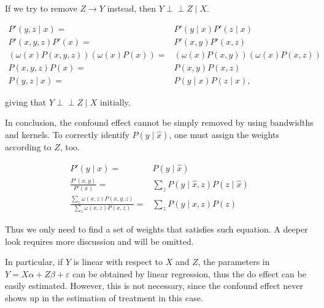\documentclass[a4 paper,12pt]{article}
\newcommand{\indep}{\perp \!\!\! \perp}
\begin{document}
If we try to remove $Z\to Y$ instead, then $Y\indep Z\mid X$.

\begin{align}
   P'(y,z\mid x)=&P'(y\mid x)P'(z\mid x)\\
   P'(x,y,z)P'(x)=&P'(x,y)P'(x,z)\\
   (\omega(x)P(x,y,z))(\omega(x)P(x))=&(\omega(x)P(x,y))(\omega(x)P(x,z))\\
   P(x,y,z)P(x)=&P(x,y)P(x,z)\\
   P(y,z\mid x)=&P(y\mid x)P(z\mid x),
\end{align}

giving that $Y\indep Z\mid X$ initially.

In conclusion, the confound effect cannot be simply removed by using bandwidths and kernels.
To correctly identify $P(y\mid\hat x)$,
one must assign the weights according to $Z$, too.

\begin{align}
   P'(y\mid x)=&P(y\mid \hat x)\\
   \frac{P'(x,y)}{P'(x)}=&\sum_z P(y\mid \hat x,z)P(z\mid \hat x)\\
   \frac{\sum_z \omega(x,z)P(x,y,z)}{\sum_z \omega(x,z)P(x,z)}=&\sum_z P(y\mid x,z)P(z)
\end{align}

Thus we only need to find a set of weights that satisfies such equation.
A deeper look requires more discussion and will be omitted.

In particular,
if $Y$ is linear with respect to $X$ and $Z$,
the parameters in $Y=X\alpha+Z\beta+\varepsilon$ can be obtained by linear regression,
thus the do effect can be easily estimated.
However, this is not necessary, since the confound effect never shows up in the estimation of treatment in this case.
\end{document}
